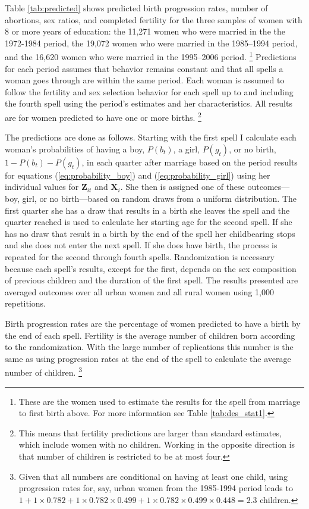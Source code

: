 \documentclass[12pt,letterpaper]{article}
\begin{document}
Table \ref{tab:predicted} shows predicted birth progression rates, number of abortions, 
sex ratios, and completed fertility for the three samples of women with 8 or more years 
of education:  
the 11,271 women who were married in the the 1972-1984 period,
the 19,072 women who were married in the 1985--1994 period,
and the 16,620 women who were married in the 1995--2006 period.%
\footnote{
These are the women used to estimate the results for the spell from marriage to first 
birth above.
For more information see Table \ref{tab:des_stat1}.
}
Predictions for each period assumes that behavior remains constant and that all spells 
a woman goes through are within the same period. 
Each woman is assumed to follow the fertility and sex selection behavior for 
each spell up to and including the fourth spell using the period's estimates and her 
characteristics. 
All results are for women predicted to have one or more births.%
\footnote{
This means that fertility predictions are larger than standard estimates, which include
women with no children.
Working in the opposite direction is that number of children is restricted to be at most 
four.
}

The predictions are done as follows.
Starting with the first spell I calculate each woman's probabilities of having a boy,
$P(b_t)$, a girl, $P(g_t)$, or no birth, $1-P(b_t)-P(g_t)$, in each quarter after marriage
based on the period results for 
equations (\ref{eq:probability_boy}) and (\ref{eq:probability_girl}) using her individual 
values for $\mathbf{Z}_{it}$ and $\mathbf{X}_{i}$.
She then is assigned one of these outcomes---boy, girl, or no birth---based on random 
draws from a uniform distribution.
The first quarter she has a draw that results in a birth she leaves the spell
and the quarter reached is used to calculate her starting age for the second spell.
If she has no draw that result in a birth by the end of the spell her childbearing 
stops and she does not enter the next spell.
If she does have birth, the process is repeated for the second through fourth spells.
Randomization is necessary because each spell's results, except for the first, depends on
the sex composition of previous children and the duration of the first spell. 
The results presented are averaged outcomes over all urban women and all rural women 
using 1,000 repetitions.


Birth progression rates are the percentage of women predicted to have a birth 
by the end of each spell.
Fertility is the average number of children born according to the randomization.
With the large number of replications this number is the same as using progression
rates at the end of the spell to calculate the average number of children.%
\footnote{
Given that all numbers are conditional on having at least one child, using progression
rates for, say, urban women from the 1985-1994 period leads to 
$1+1\times0.782+1\times0.782\times0.499+1\times0.782\times0.499\times0.448=2.3 $  
children.
}
\end{document}
